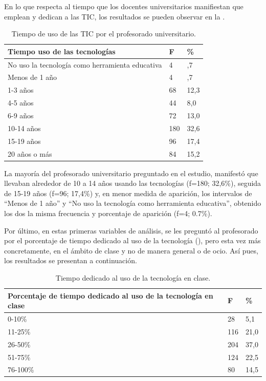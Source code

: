 \documentclass[spanish]{textolivre}
\begin{document}
En lo que respecta al tiempo que los docentes universitarios manifiestan que emplean y dedican a las TIC, los resultados se pueden observar en la .

\begin{table}[htpb]
\caption{Tiempo de uso de las TIC por el profesorado universitario.}
\label{tab3}
\centering
\begin{tabular}{p{}p{}p{}}
\toprule
Tiempo uso de las tecnologías & F & \%
\\ 
\midrule
No uso la tecnología como herramienta educativa & 4 & ,7
\\
Menos de 1 año & 4 & ,7
\\
1-3 años & 68 & 12,3
\\
4-5 años & 44 & 8,0
\\
6-9 años & 72 & 13,0
\\
10-14 años & 180 & 32,6
\\
15-19 años & 96 & 17,4
\\
20 años o más & 84 & 15,2
\\ 
\bottomrule
\end{tabular}
\end{table}

La mayoría del profesorado universitario preguntado en el estudio, manifestó que llevaban alrededor de 10 a 14 años usando las tecnologías (f=180; 32,6\%), seguida de 15-19 años (f=96; 17,4\%) y, en menor medida de aparición, los intervalos de “Menos de 1 año” y “No uso la tecnología como herramienta educativa”, obtenido los dos la misma frecuencia y porcentaje de aparición (f=4; 0.7\%). 

Por último, en estas primeras variables de análisis, se les preguntó al profesorado por el porcentaje de tiempo dedicado al uso de la tecnología (), pero esta vez más concretamente, en el ámbito de clase y no de manera general o de ocio. Así pues, los resultados se presentan a continuación. 

\begin{table}[htpb]
\caption{Tiempo dedicado al uso de la tecnología en clase.}
\label{tab4}
\centering
\begin{tabular}{p{}p{}p{}}
\toprule
Porcentaje de tiempo dedicado al uso de la tecnología en clase & F & \%
\\ 
\midrule
0-10\% & 28 & 5,1
\\
11-25\% & 116 & 21,0
\\
26-50\% & 204 & 37,0
\\
51-75\% & 124 & 22,5
\\
76-100\% & 80 & 14,5
\\ 
\bottomrule
\end{tabular}
\end{table}
\end{document}
